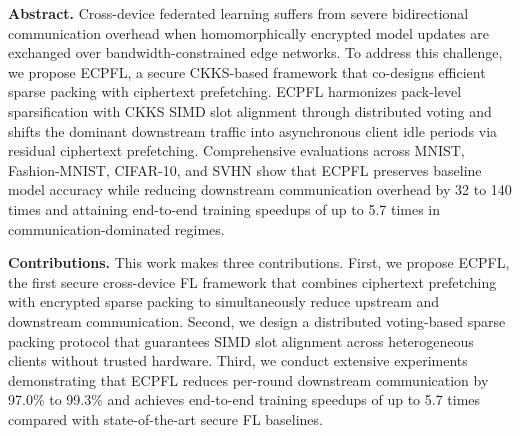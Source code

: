 \noindent\textbf{Abstract.}
Cross-device federated learning suffers from severe bidirectional communication overhead when homomorphically encrypted model updates are exchanged over bandwidth-constrained edge networks.
To address this challenge, we propose ECPFL, a secure CKKS-based framework that co-designs efficient sparse packing with ciphertext prefetching.
ECPFL harmonizes pack-level sparsification with CKKS SIMD slot alignment through distributed voting and shifts the dominant downstream traffic into asynchronous client idle periods via residual ciphertext prefetching.
Comprehensive evaluations across MNIST, Fashion-MNIST, CIFAR-10, and SVHN show that ECPFL preserves baseline model accuracy while reducing downstream communication overhead by 32 to 140 times and attaining end-to-end training speedups of up to 5.7 times in communication-dominated regimes.

\noindent\textbf{Contributions.}
This work makes three contributions.
First, we propose ECPFL, the first secure cross-device FL framework that combines ciphertext prefetching with encrypted sparse packing to simultaneously reduce upstream and downstream communication.
Second, we design a distributed voting-based sparse packing protocol that guarantees SIMD slot alignment across heterogeneous clients without trusted hardware.
Third, we conduct extensive experiments demonstrating that ECPFL reduces per-round downstream communication by 97.0\% to 99.3\% and achieves end-to-end training speedups of up to 5.7 times compared with state-of-the-art secure FL baselines.

